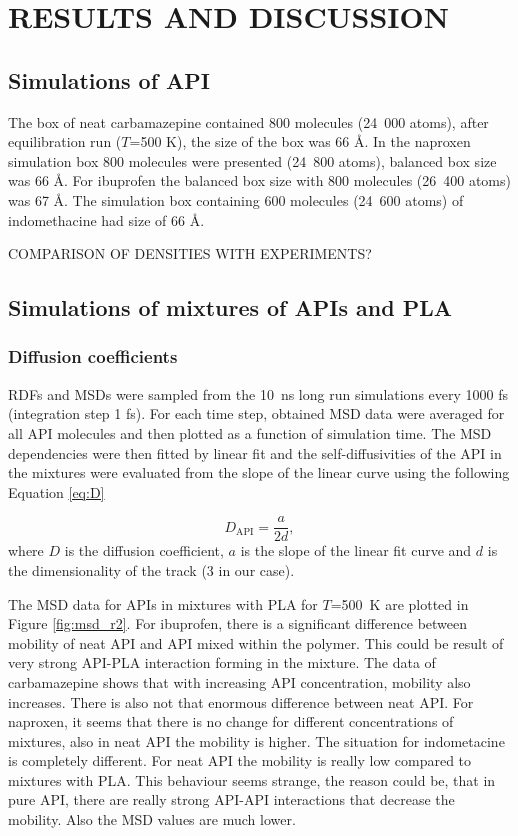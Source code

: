 \newpage
\section{RESULTS AND DISCUSSION}


\subsection{Simulations of API}
The box of neat carbamazepine contained 800 molecules (24~000 atoms), after equilibration run ($T$=500 K), the size of the box was 66 \r{A}. In the naproxen simulation box 800 molecules were presented (24~800 atoms), balanced box size was 66 \r{A}. For ibuprofen the balanced box size with 800 molecules (26~400 atoms) was 67 \r{A}. The simulation box containing 600 molecules (24~600 atoms) of indomethacine had size of 66 \r{A}.

COMPARISON OF DENSITIES WITH EXPERIMENTS?

\subsection{Simulations of mixtures of APIs and PLA}
\subsubsection{Diffusion coefficients}
RDFs and MSDs were sampled from the 10~ns long run simulations every 1000 fs (integration step 1 fs). For each time step, obtained MSD data were averaged for all API molecules and then plotted as a function of simulation time. The MSD dependencies were then fitted by linear fit and the self-diffusivities of the API in the mixtures were evaluated from the slope of the linear curve using the following Equation \ref{eq:D}

\begin{equation}\label{eq:D}
	D_{\text{API}} = \frac{a}{2d}, 
\end{equation}
where $D$ is the diffusion coefficient, $a$ is the slope of the linear fit curve and $d$ is the dimensionality of the track (3 in our case).

The MSD data for APIs in mixtures with PLA for $T$=500~K are plotted in Figure \ref{fig:msd_r2}. For ibuprofen, there is a significant difference between mobility of neat API and API mixed within the polymer. This could be result of very strong API-PLA interaction forming in the mixture. The data of carbamazepine shows that with increasing API concentration, mobility also increases. There is also not that enormous difference between neat API. For naproxen, it seems that there is no change for different concentrations of mixtures, also in neat API the mobility is higher. The situation for indometacine is completely different. For neat API the mobility is really low compared to mixtures with PLA. This behaviour seems strange, the reason could be, that in pure API, there are really strong API-API interactions that decrease the mobility. Also the MSD values are much lower.

